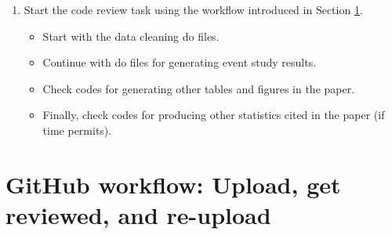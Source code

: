 \documentclass[12pt]{article}
\theoremstyle{definition}
\begin{document}
\begin{enumerate}[topsep=0pt, leftmargin=20pt, itemsep=0pt, label=(\arabic*)]
\begin{itemize}[topsep=0pt, leftmargin=22pt, itemsep=0pt]
\begin{itemize}[topsep=0pt, leftmargin=20pt, itemsep=0pt]
            Ignore maybe ``0105, 0106'', or even two ``0107'' files in the beginning, as they are not the most important parts of the data cleaning process.
            \item Continue with some do files used to generate summary statistics results in the paper, e.g., ``0401, 0402, 0403, 0601, 0602, 0701, 0702, 0703.''
            \item Proceed to do files for event studies. Some of them require the cluster, while others can be run locally. 
            
            For the latter, you can try to first get familiar with ``0303, 0305''. 
            
            For the former, it is better to run only the ``0301\_01'' do file (along with the do files ``0201, 0202, 0203'' that store necessary Stata programs for this file) in this step. This step serves three goals: (1) to have a basic understanding of the original codes for generating event study results, e.g., generating ``event $\times$ relative time period'' dummies and storing them as global macros; (2) to have a basic understanding of the quarterly aggregation procedures, which transforms the raw monthly level coefficients into quarter level; and (3) to know how to use Mercury to submut a task, extract the results, etc.
        \end{itemize}
    \end{itemize}
	\item Start the code review task using the workflow introduced in Section \ref{sec_workflow}.
	\begin{itemize}[topsep=0pt, leftmargin=22pt, itemsep=0pt]
        \setlength{\parskip}{10pt} 
        \item Start with the data cleaning do files.
        \item Continue with do files for generating event study results.
        \item Check codes for generating other tables and figures in the paper.
        \item Finally, check codes for producing other statistics cited in the paper (if time permits).
    \end{itemize}
\end{enumerate}



\section{GitHub workflow: Upload, get reviewed, and re-upload} \label{sec_workflow}
\end{document}
